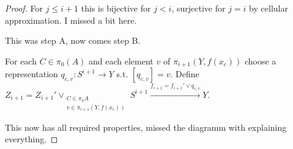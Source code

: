 \documentclass[language=english]{TemplateLecture}
\begin{document}
\begin{proof}
    For \(j \leq i+1\) this is bijective for \(j <i\), surjective for \(j = i\) by cellular approximation. I missed a bit here.

    This was step A, now comes step B.

    For each \(C \in \pi_0(A)\) and each element \(v\) of \(\pi_{i+1}(Y, f(x_c))\) choose a representation \(q_{c,v}\colon S^{i+1} \to Y\) s.t. \([q_{c,v}] = v\). Define \(Z_{i+1} = Z_{i+1}'\vee_{\substack{C\in \pi_0 A\\ v \in \pi_{i+1}(Y,f(x_c))}} S^{i+1} \xrightarrow{f_{i+1} = f_{i+1}' \vee q_{c,v}} Y\).

    This now has all required properties, missed the diagramm with explaining everything.
\end{proof}
\end{document}
